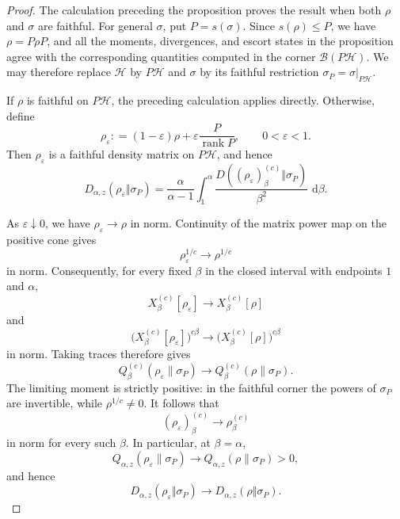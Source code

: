 \documentclass[10pt,a4paper]{amsart}
\newcommand{\cH}{\mathcal{H}}
\newcommand{\dd}{\,\mathrm d}
\newcommand{\defeq}{\mathrel{\mathop:}=}
\begin{document}
\begin{proof}
The calculation preceding the proposition proves the result when both
$\rho$ and $\sigma$ are faithful.  For general $\sigma$, put
$P=s(\sigma)$.  Since $s(\rho)\leq P$, we have $\rho=P\rho P$, and all
the moments, divergences, and escort states in the proposition agree
with the corresponding quantities computed in the corner
$\mathcal B(P\cH)$.  We may therefore replace $\cH$ by $P\cH$ and
$\sigma$ by its faithful restriction
$\sigma_P=\sigma\vert_{P\cH}$.

If $\rho$ is faithful on $P\cH$, the preceding calculation applies
directly.  Otherwise, define
\begin{equation}
  \rho_\varepsilon
  \defeq
  (1-\varepsilon)\rho
  +\varepsilon\frac{P}{\operatorname{rank}P},
  \qquad 0<\varepsilon<1.
  \label{eq:fd-faithful-regularization}
\end{equation}
Then $\rho_\varepsilon$ is a faithful density matrix on $P\cH$, and
hence
\begin{equation}
  D_{\alpha,z}(\rho_\varepsilon\Vert\sigma_P)
  =
  \frac{\alpha}{\alpha-1}
  \int_1^\alpha
  \frac{
    D((\rho_\varepsilon)_\beta^{(c)}\Vert\sigma_P)}
       {\beta^2}\,\dd\beta .
  \label{eq:fd-regularized-ray-integral}
\end{equation}

As $\varepsilon\downarrow0$, we have
$\rho_\varepsilon\to\rho$ in norm.  Continuity of the matrix power map
on the positive cone gives
\[
  \rho_\varepsilon^{1/c}\longrightarrow\rho^{1/c}
\]
in norm.  Consequently, for every fixed $\beta$ in the closed interval
with endpoints $1$ and $\alpha$,
\[
  X_\beta^{(c)}[\rho_\varepsilon]
  \longrightarrow
  X_\beta^{(c)}[\rho]
\]
and
\[
  \bigl(X_\beta^{(c)}[\rho_\varepsilon]\bigr)^{c\beta}
  \longrightarrow
  \bigl(X_\beta^{(c)}[\rho]\bigr)^{c\beta}
\]
in norm.  Taking traces therefore gives
\[
  Q_\beta^{(c)}(\rho_\varepsilon\|\sigma_P)
  \longrightarrow
  Q_\beta^{(c)}(\rho\|\sigma_P).
\]
The limiting moment is strictly positive: in the faithful corner the
powers of $\sigma_P$ are invertible, while $\rho^{1/c}\neq0$.  It
follows that
\[
  (\rho_\varepsilon)_\beta^{(c)}
  \longrightarrow
  \rho_\beta^{(c)}
\]
in norm for every such $\beta$.  In particular, at $\beta=\alpha$,
\[
  Q_{\alpha,z}(\rho_\varepsilon\|\sigma_P)
  \longrightarrow
  Q_{\alpha,z}(\rho\|\sigma_P)>0,
\]
and hence
\begin{equation}
  D_{\alpha,z}(\rho_\varepsilon\Vert\sigma_P)
  \longrightarrow
  D_{\alpha,z}(\rho\Vert\sigma_P).
  \label{eq:fd-regularized-divergence-limit}
\end{equation}


\end{proof}
\end{document}
